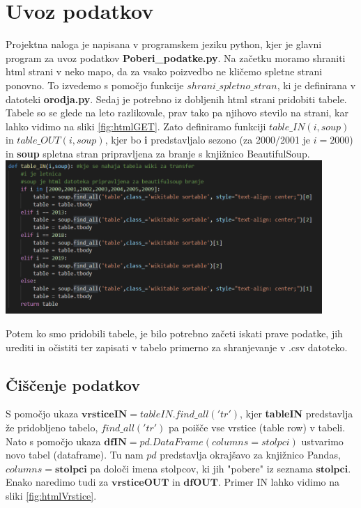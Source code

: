 \documentclass[a4paper, 12pt]{article}
\begin{document}
\section{Uvoz podatkov}

Projektna naloga je napisana v programskem jeziku python, kjer je glavni program za uvoz podatkov \textbf{Poberi\_podatke.py}.
Na začetku moramo shraniti html strani v neko mapo, da za vsako poizvedbo ne kličemo spletne strani ponovno. To izvedemo s pomočjo funkcije $shrani\_spletno\_stran$, ki je definirana v datoteki \textbf{orodja.py}.
Sedaj je potrebno iz dobljenih html strani pridobiti tabele. Tabele so se glede na leto razlikovale, prav tako pa njihovo stevilo na strani, kar lahko vidimo na sliki \ref{fig:htmlGET}. Zato definiramo funkciji $table\_IN(i,soup)$ in $table\_OUT(i,soup)$, kjer bo \textbf{i} predstavljalo sezono (za 2000/2001 je $i=2000$) in \textbf{soup} spletna stran pripravljena za branje s knjižnico BeautifulSoup. \\

\includegraphics[width=0.9\textwidth]{html}
\label{fig:htmlGET}

Potem ko smo pridobili tabele, je bilo potrebno začeti iskati prave podatke, jih urediti in očistiti ter zapisati v tabelo primerno za shranjevanje v .csv datoteko.

\subsection{Čiščenje podatkov}
S pomočjo ukaza $\textbf{vrsticeIN}=tableIN.find\_all('tr')$, kjer \textbf{tableIN} predstavlja že pridobljeno tabelo, $find\_all('tr')$ pa poišče vse vrstice (table row) v tabeli. Nato s pomočjo ukaza $\textbf{dfIN} = pd.DataFrame(columns=stolpci)$ ustvarimo novo tabel (dataframe).
Tu nam $pd$ predstavlja okrajšavo za knjižnico Pandas, $columns=\textbf{stolpci}$ pa določi imena stolpcov, ki jih "pobere" iz seznama $\textbf{stolpci}$. Enako naredimo tudi za $\textbf{vrsticeOUT}$ in $\textbf{dfOUT}$. Primer IN lahko vidimo na sliki \ref{fig:htmlVrstice}.
\pagebreak
\end{document}
